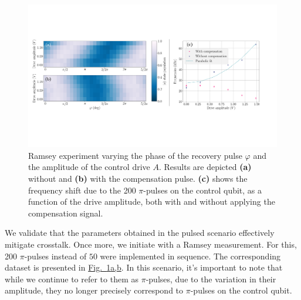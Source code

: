 
\begin{figure}
    \centering
    \includegraphics[width=\linewidth]{Images//Chap2.0/Ramsey_cancellatoin_pulsed.pdf}
    \vspace{-0.5cm}
    \caption{Ramsey experiment varying the phase of the recovery pulse $\varphi$ and the amplitude of the control drive $A$. Results are depicted \textbf{(a)} without and \textbf{(b)} with the compensation pulse. \textbf{(c)} shows the frequency shift due to the 200 $\pi$-pulses on the control qubit, as a function of the drive amplitude, both with and without applying the compensation signal.}
    \label{fig:RAMSEY_can_pulsed}
\end{figure}

We validate that the parameters obtained in the pulsed scenario effectively mitigate crosstalk.
Once more, we initiate with a Ramsey measurement.
For this, 200 $\pi$-pulses instead of $50$ were implemented in sequence.
The corresponding dataset is presented in \hyperref[fig:RAMSEY_can_pulsed]{Fig.~\ref{fig:RAMSEY_can_pulsed}a,b}.
In this scenario, it's important to note that while we continue to refer to them as $\pi$-pulses, due to the variation in their amplitude, they no longer precisely correspond to $\pi$-pulses on the control qubit.

